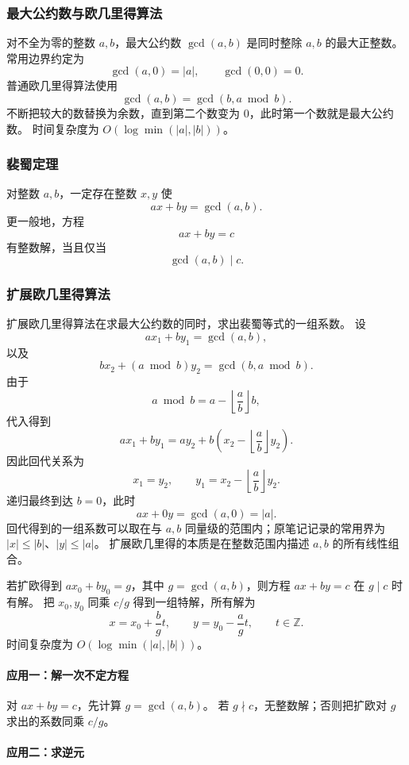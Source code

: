 \subsubsection{最大公约数与欧几里得算法}

对不全为零的整数 $a,b$，最大公约数 $\gcd(a,b)$ 是同时整除 $a,b$ 的最大正整数。
常用边界约定为
\[
  \gcd(a,0)=|a|,
  \qquad
  \gcd(0,0)=0.
\]
普通欧几里得算法使用
\[
  \gcd(a,b)=\gcd(b,a\bmod b).
\]
不断把较大的数替换为余数，直到第二个数变为 $0$，此时第一个数就是最大公约数。
时间复杂度为 $O(\log\min(|a|,|b|))$。

\subsubsection{裴蜀定理}

对整数 $a,b$，一定存在整数 $x,y$ 使
\[
  ax+by=\gcd(a,b).
\]
更一般地，方程
\[
  ax+by=c
\]
有整数解，当且仅当
\[
  \gcd(a,b)\mid c.
\]

\subsubsection{扩展欧几里得算法}

扩展欧几里得算法在求最大公约数的同时，求出裴蜀等式的一组系数。
设
\[
  ax_1+by_1=\gcd(a,b),
\]
以及
\[
  bx_2+(a\bmod b)y_2=\gcd(b,a\bmod b).
\]
由于
\[
  a\bmod b=a-\left\lfloor\frac ab\right\rfloor b,
\]
代入得到
\[
  ax_1+by_1
  =ay_2+b\left(x_2-\left\lfloor\frac ab\right\rfloor y_2\right).
\]
因此回代关系为
\[
  x_1=y_2,
  \qquad
  y_1=x_2-\left\lfloor\frac ab\right\rfloor y_2.
\]
递归最终到达 $b=0$，此时
\[
  ax+0y=\gcd(a,0)=|a|.
\]
回代得到的一组系数可以取在与 $a,b$ 同量级的范围内；原笔记记录的常用界为 $|x|\le |b|$、$|y|\le |a|$。
扩展欧几里得的本质是在整数范围内描述 $a,b$ 的所有线性组合。

若扩欧得到 $ax_0+by_0=g$，其中 $g=\gcd(a,b)$，则方程 $ax+by=c$ 在 $g\mid c$ 时有解。
把 $x_0,y_0$ 同乘 $c/g$ 得到一组特解，所有解为
\[
  x=x_0+\frac bg t,
  \qquad
  y=y_0-\frac ag t,
  \qquad t\in\mathbb Z.
\]
时间复杂度为 $O(\log\min(|a|,|b|))$。

\paragraph{应用一：解一次不定方程}

对 $ax+by=c$，先计算 $g=\gcd(a,b)$。
若 $g\nmid c$，无整数解；否则把扩欧对 $g$ 求出的系数同乘 $c/g$。

\paragraph{应用二：求逆元}

